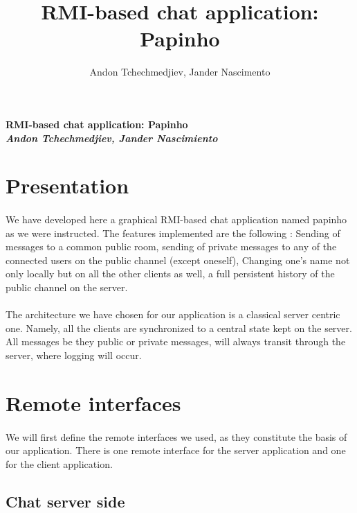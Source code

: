\documentclass[times, 8pt,twocolumn]{article}
\title {RMI-based chat application: Papinho}
\author{Andon Tchechmedjiev, Jander Nascimento}
\begin{document}
{\Large {\bf RMI-based chat application: Papinho}} \\
{\large {\bf {\it Andon Tchechmedjiev, Jander Nascimiento}}}
\section{Presentation}
\paragraph{} We have developed here a graphical RMI-based chat application named papinho as we were instructed.
The features implemented are the following : Sending of messages to a common public room, sending of private messages to any of the connected users on the public channel (except oneself), Changing one's name not only locally but on all the other clients as well, a full persistent history of the public channel on the server.
\paragraph{} The architecture we have chosen for our application is a classical server centric one. Namely, all the clients are synchronized to a central state kept on the server. All messages be they public or private messages, will always transit through the server, where logging will occur.
\section{Remote interfaces}
\paragraph{} We will first define the remote interfaces we used, as they constitute the basis of our application. There is one remote interface for the server application and one for the client application.
\subsection{Chat server side}
\end{document}
